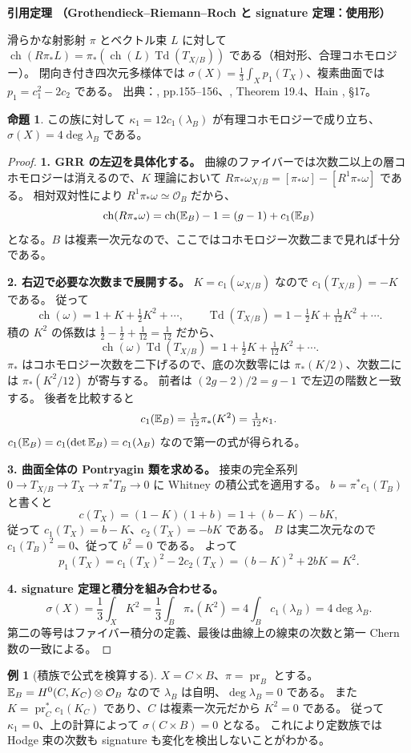 \documentclass[dvipdfmx,a4paper,11pt]{article}
\theoremstyle{definition}
\newtheorem{prop}[thm]{命題}
\newtheorem{exa}[thm]{例}
\newcommand{\OO}{\mathcal O}\newcommand{\MM}{\mathcal M}\newcommand{\TT}{\mathcal T}
\newenvironment{external}[1]{\Needspace{7\baselineskip}\refstepcounter{thm}\begin{tcolorbox}[mybox,colback=blue!2,colframe=blue!40!black]\textbf{引用定理 \thethm（#1）}\par}{\end{tcolorbox}}
\begin{document}
\begin{external}{Grothendieck--Riemann--Roch と signature 定理：使用形}
滑らかな射影射 $\pi$ とベクトル束 $L$ に対して
$\operatorname{ch}(R\pi_*L)=\pi_*(\operatorname{ch}(L)\operatorname{Td}(T_{X/B}))$ である（相対形、合理コホモロジー）。
閉向き付き四次元多様体では $\sigma(X)=\frac13\int_Xp_1(T_X)$、複素曲面では $p_1=c_1^2-2c_2$ である。
出典：\cite{HM}, pp.155--156、\cite{MS}, Theorem 19.4、Hain \cite{Hain}, \S17。
\end{external}
\begin{prop}\label{prop:signature}
この族に対して $\kappa_1=12c_1(\lambda_B)$ が有理コホモロジーで成り立ち、
$\sigma(X)=4\deg\lambda_B$ である。
\end{prop}
\begin{proof}
\textbf{1. GRR の左辺を具体化する。}
曲線のファイバーでは次数二以上の層コホモロジーは消えるので、$K$ 理論において
$R\pi_*\omega_{X/B}=[\pi_*\omega]-[R^1\pi_*\omega]$ である。
相対双対性により $R^1\pi_*\omega\simeq\OO_B$ だから、
\[
\operatorname{ch}(R\pi_*\omega)=\operatorname{ch}(\mathbb E_B)-1
=(g-1)+c_1(\mathbb E_B)
\]
となる。$B$ は複素一次元なので、ここではコホモロジー次数二まで見れば十分である。

\textbf{2. 右辺で必要な次数まで展開する。}
$K=c_1(\omega_{X/B})$ なので $c_1(T_{X/B})=-K$ である。
従って
\[
\operatorname{ch}(\omega)=1+K+\tfrac12K^2+\cdots,
\qquad
\operatorname{Td}(T_{X/B})=1-\tfrac12K+\tfrac1{12}K^2+\cdots.
\]
積の $K^2$ の係数は $\frac12-\frac12+\frac1{12}=\frac1{12}$ だから、
\[
\operatorname{ch}(\omega)\operatorname{Td}(T_{X/B})
=1+\tfrac12K+\tfrac1{12}K^2+\cdots.
\]
$\pi_*$ はコホモロジー次数を二下げるので、底の次数零には $\pi_*(K/2)$、次数二には $\pi_*(K^2/12)$ が寄与する。
前者は $(2g-2)/2=g-1$ で左辺の階数と一致する。
後者を比較すると
\[
c_1(\mathbb E_B)=\tfrac1{12}\pi_*(K^2)=\tfrac1{12}\kappa_1.
\]
$c_1(\mathbb E_B)=c_1(\det\mathbb E_B)=c_1(\lambda_B)$ なので第一の式が得られる。

\textbf{3. 曲面全体の Pontryagin 類を求める。}
接束の完全系列
$0\to T_{X/B}\to T_X\to\pi^*T_B\to0$ に Whitney の積公式を適用する。
$b=\pi^*c_1(T_B)$ と書くと
\[
c(T_X)=(1-K)(1+b)
=1+(b-K)-bK,
\]
従って $c_1(T_X)=b-K$、$c_2(T_X)=-bK$ である。
$B$ は実二次元なので $c_1(T_B)^2=0$、従って $b^2=0$ である。
よって
\[
p_1(T_X)=c_1(T_X)^2-2c_2(T_X)
=(b-K)^2+2bK=K^2.
\]

\textbf{4. signature 定理と積分を組み合わせる。}
\[
\sigma(X)=\frac13\int_XK^2
=\frac13\int_B\pi_*(K^2)
=4\int_Bc_1(\lambda_B)=4\deg\lambda_B.
\]
第二の等号はファイバー積分の定義、最後は曲線上の線束の次数と第一 Chern 数の一致による。
\end{proof}
\begin{exa}[積族で公式を検算する]
$X=C\times B$、$\pi=\operatorname{pr}_B$ とする。
$\EE_B=H^0(C,K_C)\otimes\OO_B$ なので $\lambda_B$ は自明、$\deg\lambda_B=0$ である。
また $K=\operatorname{pr}_C^*c_1(K_C)$ であり、$C$ は複素一次元だから $K^2=0$ である。
従って $\kappa_1=0$、上の計算によって $\sigma(C\times B)=0$ となる。
これにより定数族では Hodge 束の次数も signature も変化を検出しないことがわかる。
\end{exa}
\end{document}
